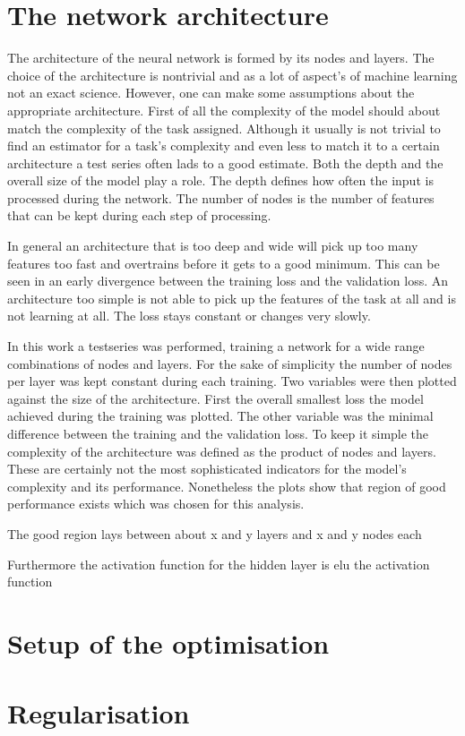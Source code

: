 \section{The network architecture}

The architecture of the neural network is formed by its nodes and layers. The choice of the architecture is nontrivial and as a lot of aspect's of machine learning not an exact science.
However, one can make some assumptions about the appropriate architecture.
First of all the complexity of the model should about match the complexity of the task assigned. Although it usually is not trivial to find an estimator for a task's complexity and even less to match it to a certain architecture a test series often lads to a good estimate.
Both the depth and the overall size of the model play a role. The depth defines how often the input is processed during the network. The number of nodes is the number of features that can be kept during each step of processing.

In general an architecture that is too deep and wide will pick up too many features too fast and overtrains before it gets to a good minimum. This can be seen in an early divergence between the training loss and the validation loss. An architecture too simple is not able to pick up the features of the task at all and is not learning at all. The loss stays constant or changes very slowly.

In this work a testseries was performed, training a network for a wide range combinations of nodes and layers. For the sake of simplicity the number of nodes per layer was kept constant during each training. Two variables were then plotted against the size of the architecture. First the overall smallest loss the model achieved during the training was plotted. The other variable was the minimal difference between the training and the validation loss. To keep it simple the complexity of the architecture was defined as the product of nodes and layers. These are certainly not the most sophisticated indicators for the model's complexity and its performance. Nonetheless the plots show that region of good performance exists which was chosen for this analysis.

The good region lays between about x and y layers and x and y nodes each

Furthermore the activation function for the hidden layer is elu
the activation function 

\section{Setup of the optimisation}

\section{Regularisation}